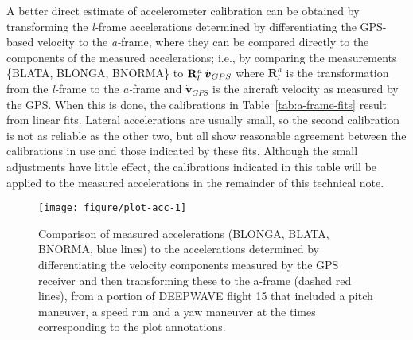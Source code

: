 \documentclass[12pt,twoside,english,12pt,twoside,english]{article}\usepackage[]{graphicx}\usepackage[]{color}
\makeatletter
\def\maxwidth{ %
  \ifdim\Gin@nat@width>\linewidth
    \linewidth
  \else
    \Gin@nat@width
  \fi
}
\newenvironment{knitrout}{}{} %
\let\OrgIndex\index
\renewcommand*{\index}[1]{\OrgIndex{#1}}
\makeatother
\begin{document}
A better direct estimate of accelerometer calibration
can be obtained by transforming
the \emph{l-}frame
accelerations determined
by differentiating the GPS-based velocity
to the \emph{a-}frame,
where they can be compared directly to the components of the measured
accelerations; i.e., by comparing the measurements \{BLATA, BLONGA,
BNORMA\} to $\mathbf{R}_{l}^{a}\thinspace\dot{\boldsymbol{v}}_{GPS}$
where $\boldsymbol{R}_{l}^{a}$ is the transformation from the \emph{l-}frame
to the \emph{a-}frame and $\dot{\boldsymbol{v}}_{GPS}$ is the aircraft
velocity as measured by the GPS.
When this is done, the calibrations
in Table~\ref{tab:a-frame-fits} result from linear fits. Lateral
accelerations are usually small, so the
second calibration is not as reliable as the other two, but all show
reasonable agreement between the calibrations in use and those indicated
by these fits. Although the small adjustments have little effect,
the calibrations indicated in this table will be applied to the measured
accelerations in the remainder of this technical note.

\begin{knitrout}
\color{fgcolor}\begin{figure}

{\centering \texttt{[image: figure/plot-acc-1]} 

}

\caption[Comparison of IRU-measured accelerations  to the accelerations determined by differentiating the velocity components measured by the GPS receiver.]{Comparison of measured accelerations (BLONGA, BLATA, BNORMA, blue lines) to the accelerations determined by differentiating the velocity components measured by the GPS receiver and then transforming these to the a-frame (dashed red lines), from a portion of DEEPWAVE flight 15 that included a pitch maneuver, a speed run and a yaw maneuver at the times corresponding to the plot annotations.}\label{fig:plot-acc}
\end{figure}


\end{knitrout}
\end{document}
